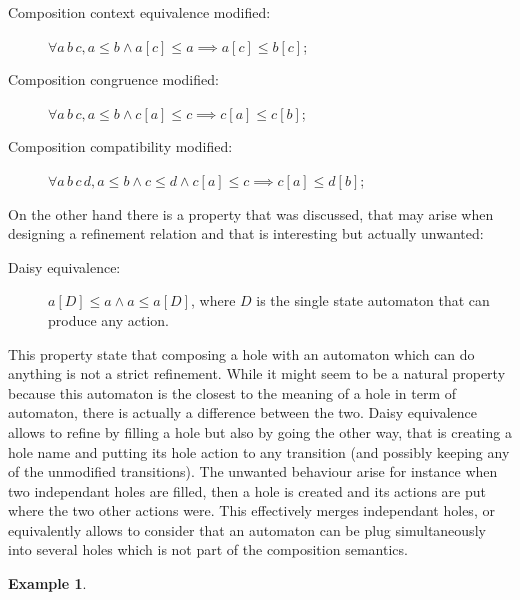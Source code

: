 \documentclass{article}
\theoremstyle{plain}
\theoremstyle{definition}
\newtheorem{exi}{Example}
\newcommand\mbrk[1]{{\left[#1\right]}}
\begin{document}
\begin{description}
\item[Composition context equivalence modified:] \(\forall a\, b\, c, a \leq b \wedge a\mbrk{c} \leq a \implies a\mbrk{c} \leq b\mbrk{c}\);
\item[Composition congruence modified:] \(\forall a\, b\, c, a \leq b \wedge c\mbrk{a} \leq c \implies c\mbrk{a} \leq c\mbrk{b}\);
\item[Composition compatibility modified:] \(\forall a\, b\, c\, d, a \leq b \wedge c \leq d \wedge c\mbrk{a} \leq c \implies c\mbrk{a} \leq d\mbrk{b}\);
\end{description}

On the other hand there is a property that was discussed, that may arise when designing a refinement relation and that is interesting but actually unwanted:
\begin{description}
\item[Daisy equivalence:] \(a\mbrk{D} \leq a \wedge a \leq a\mbrk{D}\), where \(D\) is the single state automaton that can produce any action.
\end{description}
This property state that composing a hole with an automaton which can do anything is not a strict refinement.
While it might seem to be a natural property because this automaton is the closest to the meaning of a hole in term of automaton, there is actually a difference between the two.
Daisy equivalence allows to refine by filling a hole but also by going the other way, that is creating a hole name and putting its hole action to any transition (and possibly keeping any of the unmodified transitions).
The unwanted behaviour arise for instance when two independant holes are filled, then a hole is created and its actions are put where the two other actions were.
This effectively merges independant holes, or equivalently allows to consider that an automaton can be plug simultaneously into several holes which is not part of the composition semantics.
\begin{exi}
\end{exi}
\end{document}
